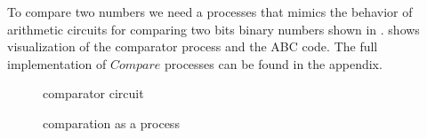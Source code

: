 To compare two numbers we need a processes that mimics the behavior of arithmetic circuits for comparing two bits binary numbers shown in 
.
 shows visualization of the comparator process and the ABC code.
The full implementation of $Compare$ processes can be found in the appendix.
\begin{figure}[H]%
\centering
{}
\caption{comparator circuit}
\label{tra_comparator_circuit}%
\end{figure}


\begin{figure}[H]%
\centering
{}%
\hspace{\fill}
%
\hspace{1em}%
%
\caption{comparation as a process}
\label{tra_addition}%
\end{figure}
